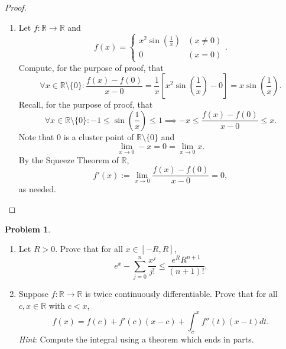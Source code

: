 \documentclass[12pt]{article}
\theoremstyle{definition}
\newtheorem{problem}{Problem}
\begin{document}
\begin{proof}
\begin{enumerate}[label=(\alph*)]
\begin{enumerate}[label=(\roman*)]
\[            \]
        \end{enumerate}
        \item Let \(f : \mathbb{R} \to \mathbb{R}\) and
        \[
            f(x) = \begin{cases}
                x^2\sin(\frac{1}{x}) & (x \neq 0) \\
                0 & (x = 0)
            \end{cases}.
        \]
        Compute, for the purpose of proof, that
        \[
            \forall x \in \mathbb{R} \setminus \{0\} : \frac{f(x) - f(0)}{x - 0} = \frac{1}{x}\left[x^2\sin\left(\frac{1}{x}\right) - 0\right] = x\sin\left(\frac{1}{x}\right).
        \]
        Recall, for the purpose of proof, that
        \[
            \forall x \in \mathbb{R} \setminus \{0\} : -1 \leq \sin\left(\frac{1}{x}\right) \leq 1 \implies -x \leq \frac{f(x) - f(0)}{x - 0} \leq x.
        \]
        Note that \(0\) is a cluster point of \(\mathbb{R} \setminus \{0\}\) and
        \[
            \lim_{x \to 0} -x = 0 = \lim_{x \to 0} x.
        \]
        By the Squeeze Theorem of \(\mathbb{R}\), 
        \[
            f'(x) := \lim_{x \to 0}\frac{f(x) - f(0)}{x - 0} = 0,
        \]
        as needed.
    \end{enumerate}
\end{proof}

\begin{problem}
    \hfill
    \begin{enumerate}[label=(\alph*)]
        \item Let \(R > 0\). Prove that for all \(x \in [-R, R]\),
        \[
            e^x - \sum_{j = 0}^{n}\frac{x^j}{j!} \leq \frac{e^{R}R^{n + 1}}{(n + 1)!}.
        \]
        \item Suppose \(f : \mathbb{R} \to \mathbb{R}\) is twice continuously diﬀerentiable. Prove that for all \(c, x \in \mathbb{R}\) with \(c < x\),
        \[
            f(x) = f(c) + f'(c)(x - c) + \int_{c}^{x}f''(t)(x - t)dt.
        \]
        \textit{Hint}: Compute the integral using a theorem which ends in parts.
    \end{enumerate}
\end{problem}
\end{document}
